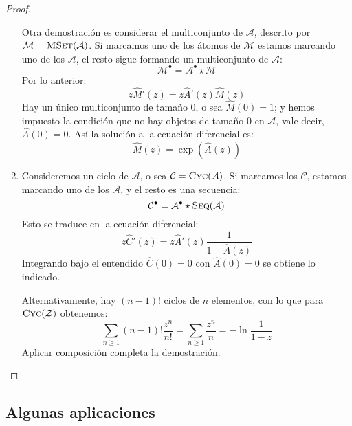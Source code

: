 \documentclass[english, spanish, fleqn, 10pt]{article}
\numberwithin{equation}{section}
\theoremstyle{definition}
\DeclareMathOperator{\Seq}{\textsc{Seq}}
\DeclareMathOperator{\Cyc}{\textsc{Cyc}}
\DeclareMathOperator{\MSet}{\textsc{MSet}}
\begin{document}
\begin{proof}
\begin{enumerate}
			Otra demostración es considerar el multiconjunto de \(\mathcal{A}\),
			descrito por \(\mathcal{M} = \MSet(\mathcal{A})\).
			Si marcamos uno de los átomos de \(\mathcal{M}\)
			estamos marcando uno de los \(\mathcal{A}\),
			el resto sigue formando un multiconjunto de \(\mathcal{A}\):
			\begin{equation*}
			\mathcal{M}^\bullet
			= \mathcal{A}^\bullet \star \mathcal{M}
			\end{equation*}
			Por lo anterior:
			\begin{equation*}
			z \widehat{M}'(z)
			= z \widehat{A}'(z) \widehat{M}(z)
			\end{equation*}
			Hay un único multiconjunto de tamaño \(0\),
			o sea \(\widehat{M}(0) = 1\);
			y hemos impuesto la condición
			que no hay objetos de tamaño \(0\) en \(\mathcal{A}\),
			vale decir,
			\(\widehat{A}(0) = 0\).
			Así la solución a la ecuación diferencial es:
			\begin{equation*}
			\widehat{M}(z)
			= \exp(\widehat{A}(z))
			\end{equation*}
			\item %
			Consideremos un ciclo de \(\mathcal{A}\),
			o sea \(\mathcal{C} = \Cyc(\mathcal{A})\).
			Si marcamos los \(\mathcal{C}\),
			estamos marcando uno de los \(\mathcal{A}\),
			y el resto es una secuencia:
			\begin{equation*}
			\mathcal{C}^\bullet
			= \mathcal{A}^\bullet \star \Seq(\mathcal{A})
			\end{equation*}
			Esto se traduce en la ecuación diferencial:
			\begin{equation*}
			z \widehat{C}'(z)
			= z \widehat{A}'(z) \frac{1}{1 - \widehat{A}(z)}
			\end{equation*}
			Integrando bajo el entendido \(\widehat{C}(0) = 0\)
			con \(\widehat{A}(0) = 0\)
			se obtiene lo indicado.
			
			Alternativamente,
			hay \((n - 1)!\) ciclos de \(n\) elementos,
			con lo que para \(\Cyc(\mathcal{Z})\) obtenemos:
			\begin{equation*}
			\sum_{n \ge 1} (n - 1)! \frac{z^n}{n!}
			= \sum_{n \ge 1} \frac{z^n}{n}
			= - \ln \frac{1}{1 - z}
			\end{equation*}
			Aplicar composición completa la demostración.
		\end{enumerate}
	\end{proof}
	
\subsection{Algunas aplicaciones}
\label{sec:ms-egf-aplicaciones}
	
\end{document}

